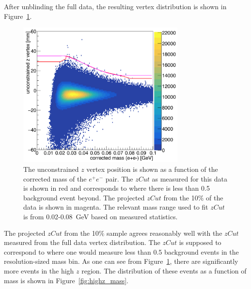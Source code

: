After unblinding the full data, the resulting vertex distribution is shown in Figure~\ref{fig:zVm_ub}.

\begin{figure}[htb]
  \centering
      \includegraphics[width=0.75\textwidth]{pics/results/zVm_ub_L1L1.png}
  \caption[Vertex position vs mass for the 100$\%$ L1L1 data at 0.5~mm]{The unconstrained $z$ vertex position is shown as a function of the corrected mass of the $e^+e^-$ pair. The $zCut$ as measured for this data is shown in red and corresponds to where there is less than 0.5 background event beyond. The projected $zCut$ from the 10$\%$ of the data is shown in magenta. The relevant mass range used to fit $zCut$ is from 0.02-0.08~GeV based on measured statistics.}
  \label{fig:zVm_ub}
\end{figure} 

The projected $zCut$ from the 10$\%$ sample agrees reasonably well with the $zCut$ measured from the full data vertex distribution. The $zCut$ is supposed to correspond to where one would measure less than 0.5 background events in the resolution-sized mass bin. As one can see from Figure~\ref{fig:zVm_ub}, there are significantly more events in the high $z$ region. The distribution of these events as a function of mass is shown in Figure~\ref{fig:highz_mass}.

